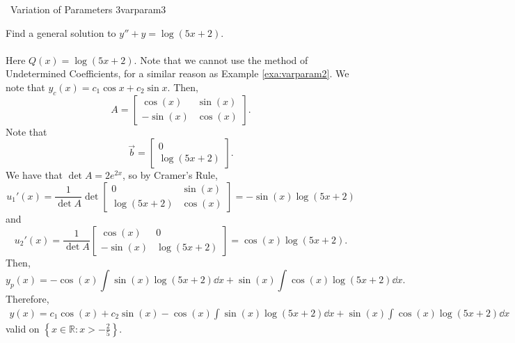         \begin{example}{\Difficulty\,\Difficulty\,\,Variation of Parameters 3}{varparam3}

            Find a general solution to \(y''+y=\log(5x+2)\). 
            \\
            \\
            Here \(Q(x)=\log(5x+2)\). Note that we cannot use the method of Undetermined Coefficients, for a similar reason as Example \ref{exa:varparam2}. We note that \(y_c(x)=c_1\cos x+c_2\sin x\). Then,
            \begin{equation*}
                A=\begin{bmatrix}
                    \cos(x) & \sin(x) \\
                    -\sin(x) & \cos(x)
                \end{bmatrix}.
            \end{equation*}
            Note that
            \begin{equation*}
                \vec{b}=\begin{bmatrix} 0 \\ \log(5x+2) \end{bmatrix}.
            \end{equation*}
            We have that \(\det A=2e^{2x}\), so by Cramer's Rule,
            \begin{equation*}
                u_1'(x)=\frac{1}{\det A}\det\begin{bmatrix}
                    0 & \sin(x) \\
                    \log(5x+2) & \cos(x)
                \end{bmatrix}=-\sin(x)\log(5x+2)
            \end{equation*}
            and
            \begin{equation*}
                u_2'(x)=\frac{1}{\det A}\begin{bmatrix}
                    \cos(x) & 0 \\
                    -\sin(x) & \log(5x+2)
                \end{bmatrix}=\cos(x)\log(5x+2).
            \end{equation*}
            Then,
            \begin{equation*}
                y_p(x)=-\cos(x)\int \sin(x)\log(5x+2)\dd x+\sin(x)\int \cos(x)\log(5x+2) \dd x.
            \end{equation*}
            Therefore,
            \begin{align*}
                y(x)=c_1\cos(x)+c_2\sin(x)-\cos(x)\int \sin(x)\log(5x+2)\dd x+\sin(x)\int \cos(x)\log(5x+2) \dd x
            \end{align*}
            valid on \(\left\{x\in\mathbb{R}:x>-\frac{2}{5}\right\}\).
            
        \end{example}

